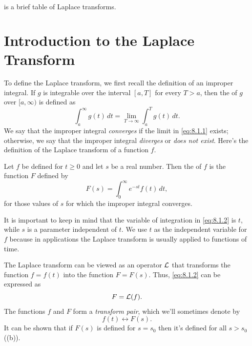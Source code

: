 \medskip
\noindent
{} is a brief table of Laplace transforms.

\newpage


\section{Introduction to the Laplace Transform}\label{sec:laplace_intro}


To define the Laplace transform, we first recall the definition of an
improper integral. If $g$ is integrable over the
interval $[a,T]$ for every $T>a$, then the  of $g$ over $[a,\infty)$ is defined as
\begin{equation} \label{eq:8.1.1}
\int^\infty_a g(t)\,dt=\lim_{T\to\infty}\int^T_a g(t)\,dt.
\end{equation}
We say that the improper integral \emph{\color{blue}converges} if the limit in
\eqref{eq:8.1.1} exists;   otherwise, we say that the improper integral
\emph{\color{blue}diverges} or \emph{\color{blue}does not exist}. Here's the definition of
the Laplace transform of a function $f$.

\begin{definition}\label{thmtype:8.1.1}
Let $f$ be defined for $t\ge0$ and let $s$ be a real number. Then the
 of $f$ is the function $F$ defined by
\begin{equation}\label{eq:8.1.2} F(s)=\int_0^\infty e^{-st} f(t)\,dt,
\end{equation} for those values of $s$ for which the improper integral
converges.
\end{definition}

It is important to keep in mind that the variable of integration in
\eqref{eq:8.1.2} is $t$, while $s$ is a parameter independent of $t$. We
use $t$ as the independent variable for $f$ because in applications
the Laplace transform is usually applied to functions of time.

The Laplace transform can be viewed as an operator ${\mathcal L}$ that
transforms the function $f=f(t)$  into the function $F=F(s)$. Thus,
\eqref{eq:8.1.2} can be expressed as
\[
F={\mathcal L}(f).
\]
The functions $f$ and $F$ form a \emph{\color{blue}transform pair}, which we'll
sometimes denote by
\[
f(t)\leftrightarrow F(s).
\]
It can be shown that if $F(s)$ is defined for $s=s_0$ then it's defined
for all $s>s_0$ ((b)).


